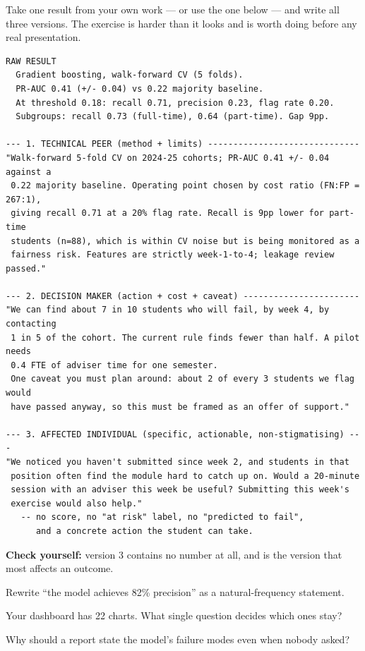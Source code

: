 \begin{lab}
Take one result from your own work --- or use the one below --- and write all three
versions. The exercise is harder than it looks and is worth doing before any real
presentation.

\begin{lstlisting}[basicstyle=\ttfamily\tiny, frame=none, backgroundcolor=\color{codebg}]
RAW RESULT
  Gradient boosting, walk-forward CV (5 folds).
  PR-AUC 0.41 (+/- 0.04) vs 0.22 majority baseline.
  At threshold 0.18: recall 0.71, precision 0.23, flag rate 0.20.
  Subgroups: recall 0.73 (full-time), 0.64 (part-time). Gap 9pp.

--- 1. TECHNICAL PEER (method + limits) ------------------------------
"Walk-forward 5-fold CV on 2024-25 cohorts; PR-AUC 0.41 +/- 0.04 against a
 0.22 majority baseline. Operating point chosen by cost ratio (FN:FP = 267:1),
 giving recall 0.71 at a 20% flag rate. Recall is 9pp lower for part-time
 students (n=88), which is within CV noise but is being monitored as a
 fairness risk. Features are strictly week-1-to-4; leakage review passed."

--- 2. DECISION MAKER (action + cost + caveat) -----------------------
"We can find about 7 in 10 students who will fail, by week 4, by contacting
 1 in 5 of the cohort. The current rule finds fewer than half. A pilot needs
 0.4 FTE of adviser time for one semester.
 One caveat you must plan around: about 2 of every 3 students we flag would
 have passed anyway, so this must be framed as an offer of support."

--- 3. AFFECTED INDIVIDUAL (specific, actionable, non-stigmatising) ---
"We noticed you haven't submitted since week 2, and students in that
 position often find the module hard to catch up on. Would a 20-minute
 session with an adviser this week be useful? Submitting this week's
 exercise would also help."
   -- no score, no "at risk" label, no "predicted to fail",
      and a concrete action the student can take.
\end{lstlisting}

\textbf{Check yourself:} version 3 contains no number at all, and is the version
that most affects an outcome.
\end{lab}

\begin{checkpoint}
\begin{tightnum}
  \item Rewrite ``the model achieves 82\% precision'' as a natural-frequency
        statement.
  \item Your dashboard has 22 charts. What single question decides which ones stay?
  \item Why should a report state the model's failure modes even when nobody asked?
\end{tightnum}
\end{checkpoint}

